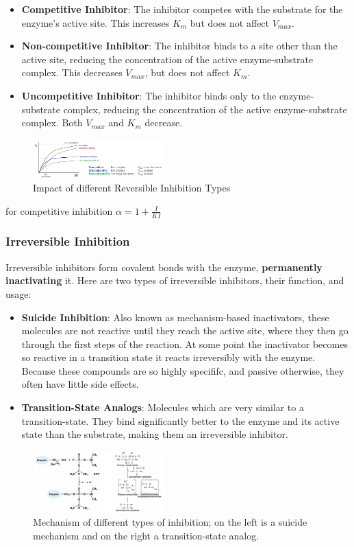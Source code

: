 \documentclass[../main.tex]{subfiles}
\begin{document}
\begin{itemize}
	\item \textbf{\gls{Competitive Inhibitor}}: The inhibitor competes with the substrate for the enzyme's active site. This increases $K_{m}$ but does not affect $V_{max}$.
	\item \textbf{\gls{Non-competitive Inhibitor}}: The inhibitor binds to a site other than the active site, reducing the concentration of the active enzyme-substrate complex. This decreases $V_{max}$, but does not affect $K_{m}$.
	\item\textbf{\gls{Uncompetitive Inhibitor}}: The inhibitor binds only to the enzyme-substrate complex, reducing the concentration of the active enzyme-substrate complex. Both $V_{max}$ and $K_{m}$ decrease.
\end{itemize}

\begin{figure}[h]
	\centering
	\includegraphics[width=0.45\textwidth]{reversible_MM}
	\caption{Impact of different Reversible Inhibition Types}
\end{figure}

\begin{remark}
    for competitive inhibition $\alpha = 1 + \frac{I}{KI} $
\end{remark}


\subsubsection{\gls{Irreversible Inhibition}}
Irreversible inhibitors form covalent bonds with the enzyme, \textbf{permanently inactivating} it.
Here are two types of irreversible inhibitors, their function, and usage:
\begin{itemize}
	\item \textbf{\gls{Suicide Inhibition}}: Also known as mechanism-based inactivators, these molecules are not reactive until they reach the active site, where they then go through the first steps of the reaction. At some point the inactivator becomes so reactive in a transition state it reacts irreversibly with the enzyme. Because these compounds are so highly specififc, and passive otherwise, they often have little side effects.
	\item \textbf{\gls{Transition-State Analogs}}: Molecules which are very similar to a transition-state. They bind significantly better to the enzyme and its active state than the substrate, making them an irreversible inhibitor.
\end{itemize}

\begin{figure}[h]
	\centering
	\includegraphics[width=0.45\textwidth]{Irreversible}
	\caption{Mechanism of different types of inhibition; on the left is a suicide mechanism and on the right a transition-state analog.}
\end{figure}
\end{document}
